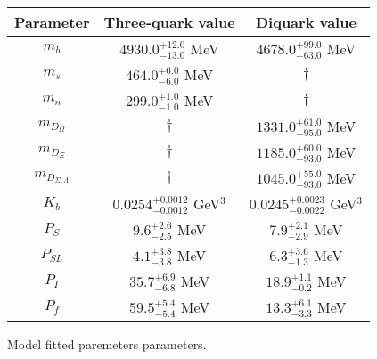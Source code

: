 \begin{tabular}{c | c c}\hline \hline
 Parameter  &  Three-quark value       & Diquark value    \\ \hline
 $m_{b}$ & $4930.0^{+12.0}_{-13.0}$ MeV & $4678.0^{+99.0}_{-63.0}$ MeV \\ 
 $m_{s}$ & $464.0^{+6.0}_{-6.0}$ MeV & $\dagger$ \\ 
 $m_{n}$ & $299.0^{+1.0}_{-1.0}$ MeV & $\dagger$ \\ 
 $m_{D_{\Omega}}$          & $\dagger$ & $1331.0^{+61.0}_{-95.0}$ MeV \\ 
 $m_{D_{\Xi}}$             & $\dagger$ & $1185.0^{+60.0}_{-93.0}$ MeV \\ 
 $m_{D_{\Sigma,\Lambda}}$ & $\dagger$ & $1045.0^{+55.0}_{-93.0}$ MeV \\ 
 $K_b$   & $0.0254^{+0.0012}_{-0.0012}$ GeV$^{3}$ & $0.0245^{+0.0023}_{-0.0022}$ GeV$^{3}$ \\ 
 $P_S$     & $9.6^{+2.6}_{-2.5}$ MeV & $7.9^{+2.1}_{-2.9}$ MeV \\ 
 $P_{SL}$     & $4.1^{+3.8}_{-3.8}$ MeV & $6.3^{+3.6}_{-1.3}$ MeV \\ 
 $P_{I}$     & $35.7^{+6.9}_{-6.8}$ MeV & $18.9^{+1.1}_{-0.2}$ MeV \\ 
 $P_{f}$     & $59.5^{+5.4}_{-5.4}$ MeV & $13.3^{+6.1}_{-3.3}$ MeV \\ 
\hline\hline
\end{tabular}
\caption{Model fitted paremeters parameters.}
\label{tab:comb_fit}
